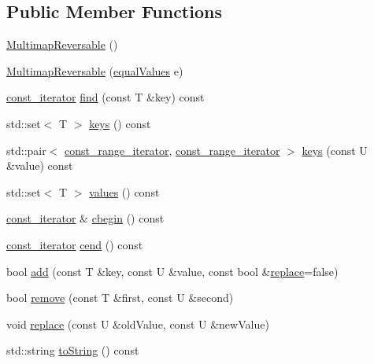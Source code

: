 \subsection*{Public Member Functions}
\begin{DoxyCompactItemize}
\item 
\hyperlink{classMultimapReversable_aa902fda23c843bd2facbedb10f26bbdf}{Multimap\+Reversable} ()
\item 
\hyperlink{classMultimapReversable_a78e8de33381156982ad34802f3b6db8d}{Multimap\+Reversable} (\hyperlink{classMultimapReversable_a73c1b30be5bb8d65b1bcfa5e0958a581}{equal\+Values} e)
\item 
\hyperlink{classMultimapReversable_ac747a36aa9a030bec3d2149d97047de5}{const\+\_\+iterator} \hyperlink{classMultimapReversable_a03a9ce69713f3bf4c9b91964cc268e10}{find} (const T \&key) const
\item 
std\+::set$<$ T $>$ \hyperlink{classMultimapReversable_a135171aef1cc98eb99df8eb63843e4da}{keys} () const
\item 
std\+::pair$<$ \hyperlink{classMultimapReversable_ae87bcf568586e240e0d294050fa248cb}{const\+\_\+range\+\_\+iterator}, \hyperlink{classMultimapReversable_ae87bcf568586e240e0d294050fa248cb}{const\+\_\+range\+\_\+iterator} $>$ \hyperlink{classMultimapReversable_a3bbe5ef69fa9537be66d4cc020a6306e}{keys} (const U \&value) const
\item 
std\+::set$<$ T $>$ \hyperlink{classMultimapReversable_a85a6dee36cb566aa874e9d18b5328757}{values} () const
\item 
\hyperlink{classMultimapReversable_ac747a36aa9a030bec3d2149d97047de5}{const\+\_\+iterator} \& \hyperlink{classMultimapReversable_a20b261236b6075cd93e16ab0ec0455c4}{cbegin} () const
\item 
\hyperlink{classMultimapReversable_ac747a36aa9a030bec3d2149d97047de5}{const\+\_\+iterator} \hyperlink{classMultimapReversable_a61a87bb3d33488b80d46fbbeffa2b91e}{cend} () const
\item 
bool \hyperlink{classMultimapReversable_a6e6c514a5fcd3df9fa0c068075064735}{add} (const T \&key, const U \&value, const bool \&\hyperlink{classMultimapReversable_ad3add05f4631934cacf20b258ca97efc}{replace}=false)
\item 
bool \hyperlink{classMultimapReversable_a11a0f10468c240813178e0a3f682eef5}{remove} (const T \&first, const U \&second)
\item 
void \hyperlink{classMultimapReversable_ad3add05f4631934cacf20b258ca97efc}{replace} (const U \&old\+Value, const U \&new\+Value)
\item 
std\+::string \hyperlink{classMultimapReversable_afaf809098df54c5619f06a71507214a4}{to\+String} () const
\end{DoxyCompactItemize}
